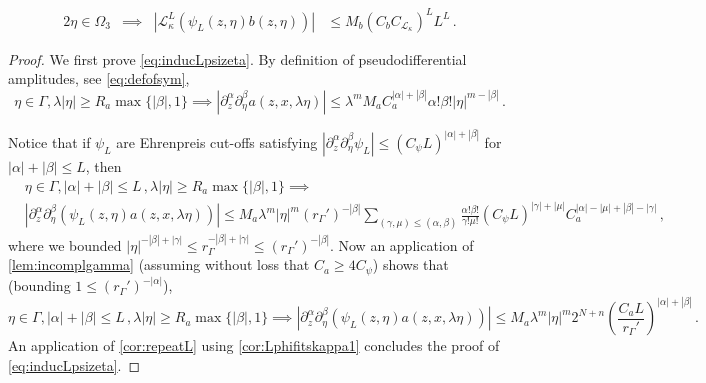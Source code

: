 \documentclass[
	fontsize=11pt, 
	twoside=false, 
	abstract=true, 
	a4paper,
]{scrartcl}
\newcommand{\abs}[1]{\left\lvert#1\right\rvert}
\newcommand{\del}{\partial}
\begin{document}
\begin{proposition}
\begin{alignat}{2}
		\eta \in \Omega_3 &\implies& \abs{\mathcal{L}_{\kappa}^L (\psi_L(z,\eta)b(z,\eta))} &\leq M_b(C_bC_{\mathcal{L}_\kappa})^L L^L\,.%
		\label{eq:inducbddana} %
	\end{alignat}
\end{proposition}
\begin{proof}
	We first prove \cref{eq:inducLpsizeta}. 
	By definition of pseudodifferential amplitudes, see \cref{eq:defofsym}, 
	\[
		\eta\in\Gamma, \lambda\abs{\eta}\geq R_a\max\{\abs{\beta},1\} \implies \abs{\del^\alpha_z\del^\beta_\eta a(z,x,\lambda\eta)} \leq \lambda^m M_a C_a^{\abs{\alpha}+\abs{\beta}}\alpha!\beta! \abs{\eta}^{m-\abs{\beta}}\,.
	\]

	Notice that if $\psi_L$ are Ehrenpreis cut-offs satisfying $\abs{\del^\alpha_z\del^\beta_\eta\psi_L}\leq (C_\psi L)^{\abs{\alpha}+\abs{\beta}}$ for $\abs{\alpha}+\abs{\beta}\leq L$, then
	\begin{align*}
		&{}\eta\in\Gamma,\abs{\alpha}+\abs{\beta}\leq L\,,\lambda\abs{\eta}\geq R_a\max\{\abs{\beta},1\} \implies \\
		&{}\abs{\del^\alpha_z\del^\beta_\eta (\psi_L(z,\eta)a(z,x,\lambda\eta))} \leq M_a\lambda^m\abs{\eta}^{m} (r_\Gamma')^{-\abs{\beta}}
		\sum_{(\gamma,\mu)\leq (\alpha,\beta)} \frac{\alpha!\beta!}{\gamma!\mu!} (C_\psi L)^{\abs{\gamma}+\abs{\mu}} C_a^{\abs{\alpha}-\abs{\mu}+\abs{\beta}-\abs{\gamma}}\,,
	\end{align*}
	where we bounded $\abs{\eta}^{-\abs{\beta}+\abs{\gamma}} \leq r_\Gamma^{-\abs{\beta}+\abs{\gamma}} \leq (r_{\Gamma}')^{-\abs{\beta}}$. Now an application of \cref{lem:incomplgamma} (assuming without loss that $C_a \geq 4C_\psi$) shows that (bounding $1 \leq (r_\Gamma')^{-\abs{\alpha}}$),
	\[
		\eta\in\Gamma, \abs{\alpha}+\abs{\beta}\leq L\,,\lambda\abs{\eta}\geq R_a\max\{\abs{\beta},1\} \implies \abs{\del^\alpha_z\del^\beta_\eta (\psi_L(z,\eta) a(z,x,\lambda\eta))} \leq M_a\lambda^m \abs{\eta}^{m} 2^{N+n}\left(\frac{C_a L}{r_\Gamma'}\right)^{\abs{\alpha}+\abs{\beta}}\,.
	\]
	An application of \cref{cor:repeatL} using \cref{cor:Lphifitskappa1} concludes the proof of \cref{eq:inducLpsizeta}.


\end{proof}
\end{document}
